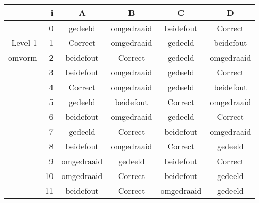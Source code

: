 \begin{tabular}{ rr| c|c|c|c}\hline\hline
     & i & \textbf{A} & \textbf{B} & \textbf{C} & \textbf{D}\\\hline

&0&gedeeld&omgedraaid&beidefout&Correct\cellcolor[gray]{0.6}\\
Level 1 & 1&Correct\cellcolor[gray]{0.6}&omgedraaid&gedeeld&beidefout\\
omvorm &2&beidefout&Correct\cellcolor[gray]{0.6}&gedeeld&omgedraaid\\
&3&beidefout&omgedraaid&gedeeld&Correct\cellcolor[gray]{0.6}\\
&4&Correct\cellcolor[gray]{0.6}&omgedraaid&gedeeld&beidefout\\
&5&gedeeld&beidefout&Correct\cellcolor[gray]{0.6}&omgedraaid\\
&6&beidefout&omgedraaid&gedeeld&Correct\cellcolor[gray]{0.6}\\
&7&gedeeld&Correct\cellcolor[gray]{0.6}&beidefout&omgedraaid\\
&8&beidefout&omgedraaid&Correct\cellcolor[gray]{0.6}&gedeeld\\
&9&omgedraaid&gedeeld&beidefout&Correct\cellcolor[gray]{0.6}\\
&10&omgedraaid&Correct\cellcolor[gray]{0.6}&beidefout&gedeeld\\
&11&beidefout&Correct\cellcolor[gray]{0.6}&omgedraaid&gedeeld\\
\hline\end{tabular}\par\ \newline

